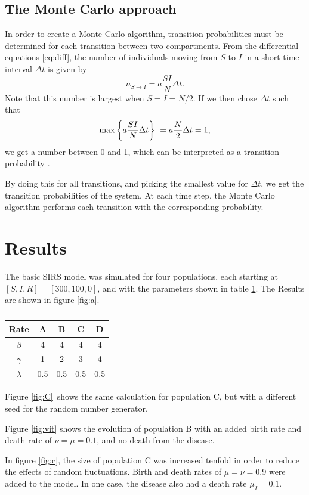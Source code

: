 \documentclass[a4paper,10pt,twocolumn]{article}
\begin{document}
\subsection{The Monte Carlo approach}

In order to create a Monte Carlo algorithm, transition probabilities must be determined for each transition between two compartments. 
From the differential equations \ref{eq:diff}, the number of individuals moving from $S$ to $I$ in a short time interval $\Delta t$ is given by
\[
n_{S\to I} = a\frac{SI}{N}\Delta t.
\]  
Note that this number is largest when $S=I=N/2$. If we then chose $\Delta t$ such that
\[
\max\qty{a\frac{SI}{N}\Delta t} = a\frac{N}{2}\Delta t = 1,
\]
we get a number between 0 and 1, which can be interpreted as a transition probability \cite{labtext}. 

By doing this for all transitions, and picking the smallest value for $\Delta t$, we get the transition probabilities of the system. 
At each time step, the Monte Carlo algorithm performs each transition with the corresponding probability. 


%
%
%
\section{Results}

The basic SIRS model was simulated for four populations, each starting at $[S,I,R]=[300,100,0]$, and with the parameters shown in table \ref{tab:a}. The Results are shown in figure \ref{fig:a}. 
\begin{table}[h]
	\centering
	\caption{}
	\label{tab:a}
	\begin{tabular}{ccccc}\hline
	\bf Rate & \bf A & \bf B & \bf C & \bf D \\\hline
	$\beta$ & 4 & 4 & 4 & 4 \\
	$\gamma$ & 1 & 2 & 3 & 4 \\
	$\lambda$ & 0.5 & 0.5 & 0.5 & 0.5 \\\hline
	\end{tabular}
\end{table}

Figure \ref{fig:C} shows the same calculation for population C, but with a different seed for the random number generator.

Figure \ref{fig:vit} shows the evolution of population B with an added birth rate and death rate of $\nu=\mu=0.1$, and no death from the disease. 

In figure \ref{fig:c}, the size of population C was increased tenfold in order to reduce the effects of random fluctuations. Birth and death rates of $\mu=\nu=0.9$ were added to the model. In one case, the disease also had a death rate $\mu_I = 0.1$. 
\end{document}
